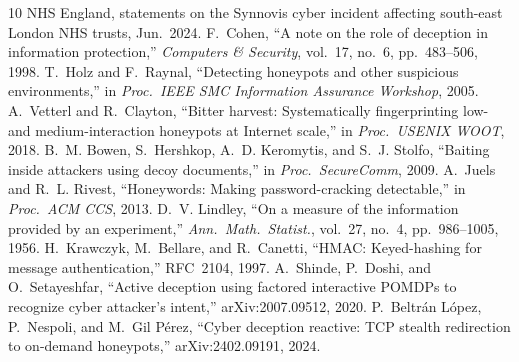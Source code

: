 \documentclass[conference,10pt]{IEEEtran}
\begin{document}
\begin{thebibliography}{10}
\scriptsize
\setlength{\itemsep}{0pt}
 NHS England, statements on the Synnovis cyber incident affecting
south-east London NHS trusts, Jun.\ 2024.
 F.~Cohen, ``A note on the role of deception in information
protection,'' \emph{Computers \& Security}, vol.~17, no.~6, pp.~483--506, 1998.
 T.~Holz and F.~Raynal, ``Detecting honeypots and other suspicious
environments,'' in \emph{Proc.\ IEEE SMC Information Assurance Workshop}, 2005.
 A.~Vetterl and R.~Clayton, ``Bitter harvest: Systematically
fingerprinting low- and medium-interaction honeypots at Internet scale,'' in \emph{Proc.\ USENIX
WOOT}, 2018.
 B.~M. Bowen, S.~Hershkop, A.~D. Keromytis, and S.~J. Stolfo, ``Baiting
inside attackers using decoy documents,'' in \emph{Proc.\ SecureComm}, 2009.
 A.~Juels and R.~L. Rivest, ``Honeywords: Making password-cracking
detectable,'' in \emph{Proc.\ ACM CCS}, 2013.
 D.~V. Lindley, ``On a measure of the information provided by an
experiment,'' \emph{Ann.\ Math.\ Statist.}, vol.~27, no.~4, pp.~986--1005, 1956.
 H.~Krawczyk, M.~Bellare, and R.~Canetti, ``HMAC: Keyed-hashing for message
authentication,'' RFC~2104, 1997.
 A.~Shinde, P.~Doshi, and O.~Setayeshfar, ``Active deception using
factored interactive POMDPs to recognize cyber attacker's intent,'' arXiv:2007.09512, 2020.
 P.~Beltr\'an L\'opez, P.~Nespoli, and M.~Gil P\'erez, ``Cyber
deception reactive: TCP stealth redirection to on-demand honeypots,'' arXiv:2402.09191, 2024.
\end{thebibliography}
\end{document}
